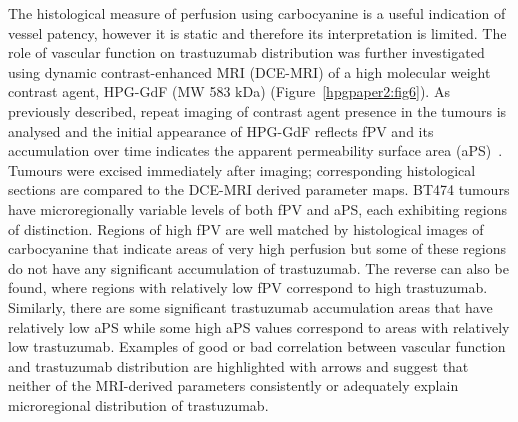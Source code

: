 The histological measure of perfusion using carbocyanine is a useful indication of vessel patency, however it is static and therefore its interpretation is limited.
The role of vascular function on trastuzumab distribution was further investigated using dynamic contrast-enhanced MRI (DCE-MRI) of a high molecular weight contrast agent, \acs{HPG-GdF} (MW 583 kDa) (Figure~\ref{hpgpaper2:fig6}).
As previously described, repeat imaging of contrast agent presence in the tumours is analysed and the initial appearance of \acs{HPG-GdF} reflects \acs{fPV} and its accumulation over time indicates the apparent permeability surface area (aPS)~\cite{Baker:2015cob}.
Tumours were excised immediately after imaging; corresponding histological sections are compared to the DCE-MRI derived parameter maps.
\acs{BT474} tumours have microregionally variable levels of both \acs{fPV} and \acs{aPS}, each exhibiting regions of distinction.
Regions of high \acs{fPV} are well matched by histological images of carbocyanine that indicate areas of very high perfusion but some of these regions do not have any significant accumulation of trastuzumab.
The reverse can also be found, where regions with relatively low \acs{fPV} correspond to high trastuzumab.
Similarly, there are some significant trastuzumab accumulation areas that have relatively low \acs{aPS} while some high \acs{aPS} values correspond to areas with relatively low trastuzumab.
Examples of good or bad correlation between vascular function and trastuzumab distribution are highlighted with arrows and suggest that neither of the MRI-derived parameters consistently or adequately explain microregional distribution of trastuzumab.

